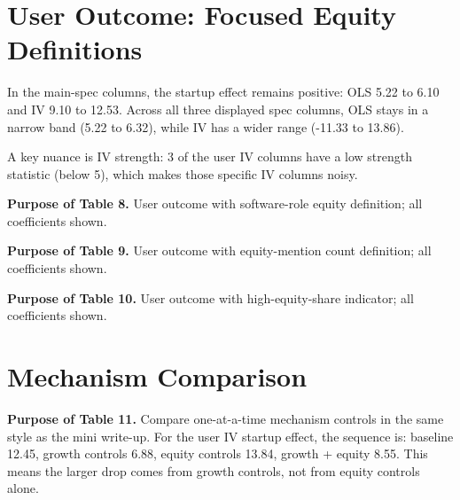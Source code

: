 \documentclass{article}
\newcommand{\cleanedresultsdir}{../results/cleaned/tex}
\newcommand{\TableInput}[2][\linewidth]{}
\begin{document}
\section*{User Outcome: Focused Equity Definitions}
In the main-spec columns, the startup effect remains positive:
OLS 5.22 to 6.10 and IV 9.10 to 12.53.
Across all three displayed spec columns, OLS stays in a narrow band (5.22 to 6.32), while IV has a wider range (-11.33 to 13.86).

\noindent A key nuance is IV strength: 3 of the user IV columns have a low strength statistic (below 5), which makes those specific IV columns noisy.

\noindent\textbf{Purpose of Table 8.} User outcome with software-role equity definition; all coefficients shown.

\begin{table}[H]
  \centering
  \caption{User outcome: any equity mention (software roles only), full specification set}
  \TableInput{\cleanedresultsdir/llm_equity_pi_followups_user_measure_software.tex}
\end{table}

\noindent\textbf{Purpose of Table 9.} User outcome with equity-mention count definition; all coefficients shown.

\begin{table}[H]
  \centering
  \caption{User outcome: average number of equity mentions, full specification set}
  \TableInput{\cleanedresultsdir/llm_equity_pi_followups_user_measure_count.tex}
\end{table}

\noindent\textbf{Purpose of Table 10.} User outcome with high-equity-share indicator; all coefficients shown.

\begin{table}[H]
  \centering
  \caption{User outcome: high equity-share indicator (top quartile), full specification set}
  \TableInput{\cleanedresultsdir/llm_equity_pi_followups_user_measure_topq.tex}
\end{table}

\section*{Mechanism Comparison}
\noindent\textbf{Purpose of Table 11.} Compare one-at-a-time mechanism controls in the same style as the mini write-up.
For the user IV startup effect, the sequence is:
baseline 12.45,
growth controls 6.88,
equity controls 13.84,
growth + equity 8.55.
This means the larger drop comes from growth controls, not from equity controls alone.
\end{document}
